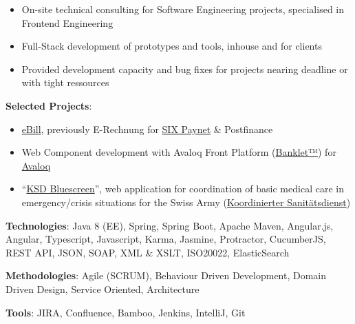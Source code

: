 \documentclass[10pt, a4paper, ragged2e]{altacv}
\begin{document}

\begin{itemize}
	\item On-site technical consulting for Software Engineering projects, specialised in Frontend Engineering
	\item Full-Stack development of prototypes and tools, inhouse and for clients
	\item Provided development capacity and bug fixes for projects nearing deadline or with tight ressources
\end{itemize}

\textbf{Selected Projects}:
\begin{itemize}
	\item \href{https://www.ebill.ch/}{eBill}, previously E-Rechnung for \href{https://www.six-group.com/en/site/banking-services/paynet.html}{SIX Paynet} \& Postfinance
	\item Web Component development with Avaloq Front Platform (\href{https://developer.avaloq.com/web/developer-portal/learn}{Banklet™}) for \href{https://www.avaloq.com/en/}{Avaloq}
	\item \enquote{\href{https://blog.alertswiss.ch/de/rubriken/bevoelkerungsschutz/koordinierter-sanitaetsdienst-ksd-neues-management-tool-blue-screen-switzerland/}{KSD Bluescreen}}, web application for coordination of basic medical care in emergency/crisis situations for the Swiss Army (\href{https://www.vtg.admin.ch/de/organisation/astab/san/ksd.html}{Koordinierter Sanitätsdienst})
\end{itemize}

\textbf{Technologies}: Java 8 (EE), Spring, Spring Boot, Apache Maven, Angular.js, Angular, Typescript, Javascript, Karma, Jasmine, Protractor, CucumberJS, REST API, JSON, SOAP, XML \& XSLT, ISO20022, ElasticSearch

\textbf{Methodologies}: Agile (SCRUM), Behaviour Driven Development, Domain Driven Design, Service Oriented, Architecture

\textbf{Tools}: JIRA, Confluence, Bamboo, Jenkins, IntelliJ, Git
\end{document}
